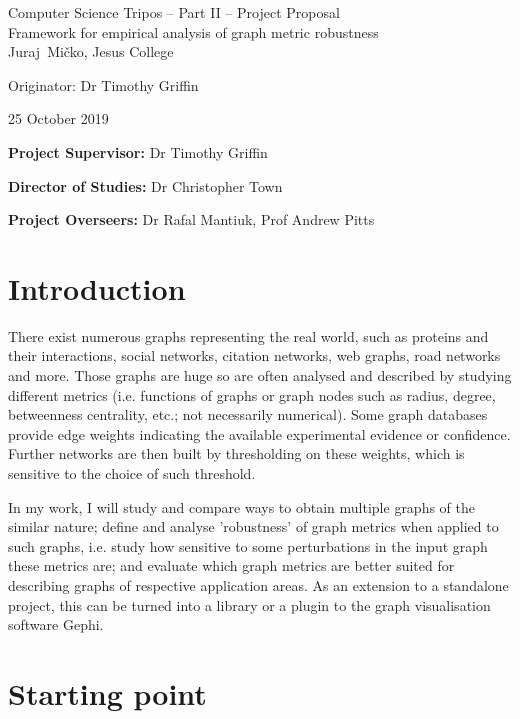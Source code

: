 \documentclass[12pt,a4paper,twoside]{article}
\begin{document}
\begin{center}
	\Large
	Computer Science Tripos -- Part II -- Project Proposal\\[4mm]
	\LARGE
	Framework for empirical analysis of graph metric robustness\\[4mm]
	
	\large
	Juraj~Mi\v{c}ko, Jesus College

	Originator: Dr Timothy Griffin

	25 October 2019
\end{center}

\vspace{5mm}

\textbf{Project Supervisor:} Dr Timothy Griffin

\textbf{Director of Studies:} Dr Christopher Town

\textbf{Project Overseers:} Dr Rafal Mantiuk, Prof Andrew Pitts

\section*{Introduction}

	There exist numerous graphs representing the real world, such as proteins and their interactions, social networks, citation networks, web graphs, road networks and more. Those graphs are huge so are often analysed and described by studying different metrics (i.e. functions of graphs or graph nodes such as radius, degree, betweenness centrality, etc.; not necessarily numerical). Some graph databases provide edge weights indicating the available experimental evidence or confidence. Further networks are then built by thresholding on these weights, which is sensitive to the choice of such threshold.

    In my work, I will study and compare ways to obtain multiple graphs of the similar nature; define and analyse 'robustness' of graph metrics when applied to such graphs, i.e. study how sensitive to some perturbations in the input graph these metrics are; and evaluate which graph metrics are better suited for describing graphs of respective application areas. As an extension to a standalone project, this can be turned into a library or a plugin to the graph visualisation software Gephi.

\section*{Starting point}
\end{document}
